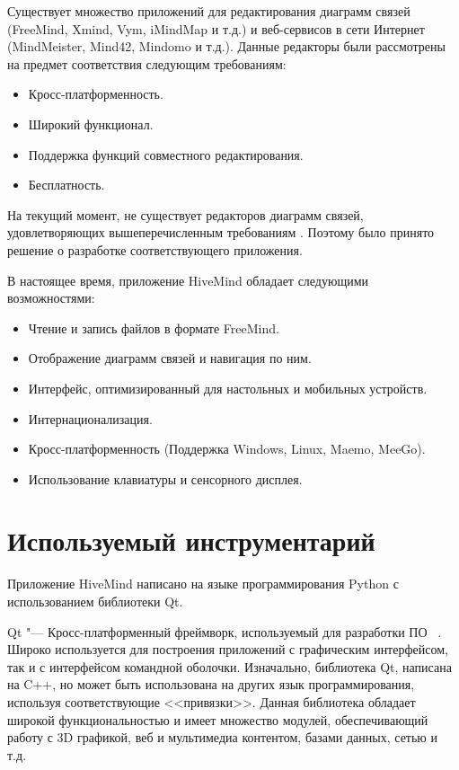 Существует множество приложений для редактирования диаграмм связей (FreeMind,
Xmind, Vym, iMindMap и т.д.) и веб-сервисов в сети Интернет (MindMeister,
Mind42, Mindomo и т.д.). Данные редакторы были рассмотрены на предмет
соответствия следующим требованиям:
\begin{itemize}
\item Кросс-платформенность.
\item Широкий функционал.
\item Поддержка функций совместного редактирования.
\item Бесплатность.
\end{itemize}
На текущий момент, не существует редакторов диаграмм связей, удовлетворяющих
вышеперечисленным требованиям \cite{hivemind-8th-fruct}. Поэтому было принято
решение о разработке соответствующего приложения.

В настоящее время, приложение HiveMind обладает следующими возможностями:
\begin{itemize}
\item Чтение и запись файлов в формате FreeMind.
\item Отображение диаграмм связей и навигация по ним.
\item Интерфейс, оптимизированный для настольных и мобильных устройств.
\item Интернационализация.
\item Кросс-платформенность (Поддержка Windows, Linux, Maemo, MeeGo).
\item Использование клавиатуры и сенсорного дисплея.
\end{itemize}


\section{Используемый инструментарий}
\label{sec:toolkit}
Приложение HiveMind написано на языке программирования Python с использованием
библиотеки Qt.

Qt "--- Кросс-платформенный фреймворк, используемый для разработки ПО
~\cite{qt4}. Широко используется для построения приложений с графическим
интерфейсом, так и с интерфейсом командной оболочки. Изначально, библиотека Qt,
написана на C++, но может быть использована на других язык программирования,
используя соответствующие <<привязки>>. Данная библиотека обладает широкой
функциональностью и имеет множество модулей, обеспечивающий работу с 3D
графикой, веб и мультимедиа контентом, базами данных, сетью и т.д.

